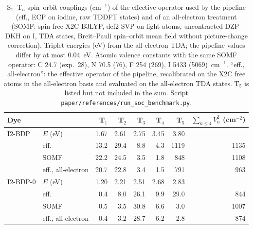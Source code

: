 \documentclass[journal=jctcce,manuscript=article]{achemso}
\begin{document}
\begin{table}
  \caption{S$_1$--T$_n$ spin--orbit couplings (cm$^{-1}$) of the effective operator used by the pipeline (eff.,
  ECP on iodine, raw TDDFT states) and of an all-electron treatment (SOMF: spin-free X2C B3LYP, def2-SVP on light
  atoms, uncontracted DZP-DKH on I, TDA states, Breit--Pauli spin--orbit mean field without picture-change
  correction). Triplet energies (eV) from the all-electron TDA; the pipeline values differ by at most 0.04~eV.
  Atomic valence constants with the same SOMF operator: C 24.7 (exp.\ 28), N 70.5 (76), F 254 (269),
  I 5433 (5069)~cm$^{-1}$. ``eff., all-electron'': the effective operator of the pipeline, recalibrated on the
X2C free atoms in the all-electron basis and evaluated on the all-electron TDA states. T$_5$ is listed but not included in the sum. Script \texttt{paper/references/run\_soc\_benchmark.py}.}
  \label{tab:socbench}
  \begin{tabular}{llrrrrrr}
    \toprule
    Dye & & T$_1$ & T$_2$ & T$_3$ & T$_4$ & T$_5$ & $\sum_{n\le4}V_n^2$ (cm$^{-2}$) \\
    \midrule
    I2-BDP   & $E$ (eV) & 1.67 & 2.61 & 2.75 & 3.45 & 3.80 & \\
             & eff.     & 13.2 & 29.4 & 8.8 & 4.3 & 1119 & 1135 \\
             & SOMF     & 22.2 & 24.5 & 3.5 & 1.8 & 848  & 1108 \\
             & eff., all-electron & 20.7 & 22.8 & 3.4 & 1.5 & 791 & 963 \\
    I2-BDP-0 & $E$ (eV) & 1.20 & 2.21 & 2.51 & 2.68 & 2.83 & \\
             & eff.     & 0.4 & 8.0 & 26.1 & 9.9 & 29.0 & 844 \\
             & SOMF     & 0.5 & 3.5 & 30.8 & 6.6 & 3.0  & 1007 \\
             & eff., all-electron & 0.4 & 3.2 & 28.7 & 6.2 & 2.8 & 874 \\
    \bottomrule
  \end{tabular}
\end{table}

\clearpage

\end{document}
